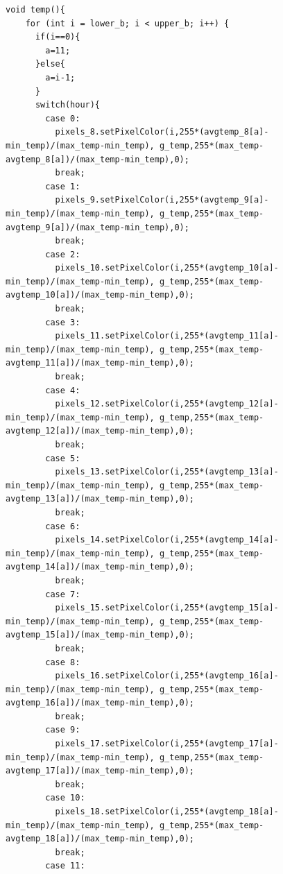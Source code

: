 \documentclass[a4paper,9pt]{article}
\begin{document}
\begin{lstlisting}[basicstyle=\tiny,style=CStyle]
  void temp(){
    for (int i = lower_b; i < upper_b; i++) {
      if(i==0){
        a=11;
      }else{
        a=i-1;
      }
      switch(hour){
        case 0:
          pixels_8.setPixelColor(i,255*(avgtemp_8[a]-min_temp)/(max_temp-min_temp), g_temp,255*(max_temp-avgtemp_8[a])/(max_temp-min_temp),0);
          break;
        case 1:
          pixels_9.setPixelColor(i,255*(avgtemp_9[a]-min_temp)/(max_temp-min_temp), g_temp,255*(max_temp-avgtemp_9[a])/(max_temp-min_temp),0);
          break;
        case 2:
          pixels_10.setPixelColor(i,255*(avgtemp_10[a]-min_temp)/(max_temp-min_temp), g_temp,255*(max_temp-avgtemp_10[a])/(max_temp-min_temp),0);
          break;
        case 3:
          pixels_11.setPixelColor(i,255*(avgtemp_11[a]-min_temp)/(max_temp-min_temp), g_temp,255*(max_temp-avgtemp_11[a])/(max_temp-min_temp),0);
          break;
        case 4:
          pixels_12.setPixelColor(i,255*(avgtemp_12[a]-min_temp)/(max_temp-min_temp), g_temp,255*(max_temp-avgtemp_12[a])/(max_temp-min_temp),0);
          break;
        case 5:
          pixels_13.setPixelColor(i,255*(avgtemp_13[a]-min_temp)/(max_temp-min_temp), g_temp,255*(max_temp-avgtemp_13[a])/(max_temp-min_temp),0);
          break;
        case 6:
          pixels_14.setPixelColor(i,255*(avgtemp_14[a]-min_temp)/(max_temp-min_temp), g_temp,255*(max_temp-avgtemp_14[a])/(max_temp-min_temp),0);
          break;
        case 7:
          pixels_15.setPixelColor(i,255*(avgtemp_15[a]-min_temp)/(max_temp-min_temp), g_temp,255*(max_temp-avgtemp_15[a])/(max_temp-min_temp),0);
          break;
        case 8:  
          pixels_16.setPixelColor(i,255*(avgtemp_16[a]-min_temp)/(max_temp-min_temp), g_temp,255*(max_temp-avgtemp_16[a])/(max_temp-min_temp),0);
          break;
        case 9:  
          pixels_17.setPixelColor(i,255*(avgtemp_17[a]-min_temp)/(max_temp-min_temp), g_temp,255*(max_temp-avgtemp_17[a])/(max_temp-min_temp),0);
          break;
        case 10:  
          pixels_18.setPixelColor(i,255*(avgtemp_18[a]-min_temp)/(max_temp-min_temp), g_temp,255*(max_temp-avgtemp_18[a])/(max_temp-min_temp),0);
          break;
        case 11:
          

\end{lstlisting}
\end{document}
